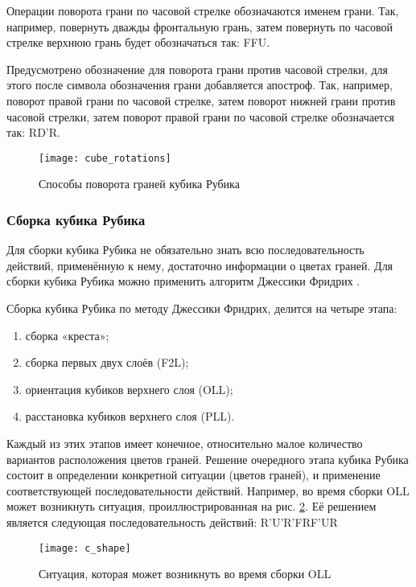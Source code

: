 Операции поворота грани по часовой стрелке обозначаются именем грани. Так, например, повернуть дважды фронтальную грань, затем повернуть по часовой стрелке верхнюю грань будет обозначаться так: FFU.

Предусмотрено обозначение для поворота грани против часовой стрелки, для этого после символа обозначения грани добавляется апостроф. Так, например, поворот правой грани по часовой стрелке, затем поворот нижней грани против часовой стрелки, затем поворот правой грани по часовой стрелке обозначается так: RD’R.

\begin{figure}[ht]
	\centering
	\texttt{[image: cube\_rotations]}
	\caption{Способы поворота граней кубика Рубика}
	\label{fig:cube_rotations}
\end{figure}

\subsubsection{Сборка кубика Рубика}
Для сборки кубика Рубика не обязательно знать всю последовательность действий, применённую к нему, достаточно информации о цветах граней. Для сборки кубика Рубика можно применить алгоритм Джессики Фридрих \cite{bib:fridrich}.

Сборка кубика Рубика по методу Джессики Фридрих, делится на четыре этапа:
\begin{enumerate}
	\item сборка «креста»;
	\item сборка первых двух слоёв (F2L);
	\item ориентация кубиков верхнего слоя (OLL);
	\item расстановка кубиков верхнего слоя (PLL).
\end{enumerate}

Каждый из этих этапов имеет конечное, относительно малое количество вариантов расположения цветов граней. Решение очередного этапа кубика Рубика состоит в определении конкретной ситуации (цветов граней), и применение соответствующей последовательности действий. Например, во время сборки OLL может возникнуть ситуация, проиллюстрированная на рис. \ref{fig:c_shape}. Её решением является следующая последовательность действий: R'U'R'FRF'UR

\begin{figure}[ht]
	\centering
	\texttt{[image: c\_shape]}
	\caption{Ситуация, которая может возникнуть во время сборки OLL}
	\label{fig:c_shape}
\end{figure}

